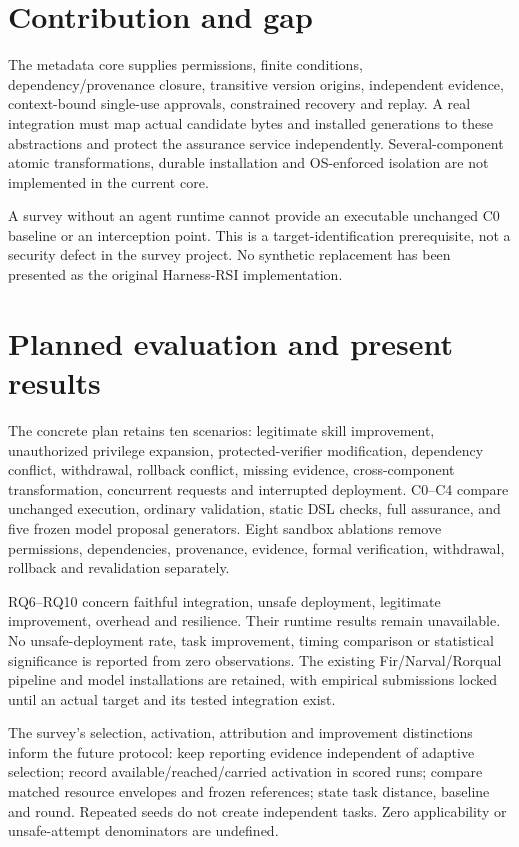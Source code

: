 \documentclass[11pt]{article}
\begin{document}
\section{Contribution and gap}
The metadata core supplies permissions, finite conditions, dependency/provenance closure, transitive version origins, independent evidence, context-bound single-use approvals, constrained recovery and replay. A real integration must map actual candidate bytes and installed generations to these abstractions and protect the assurance service independently. Several-component atomic transformations, durable installation and OS-enforced isolation are not implemented in the current core.

A survey without an agent runtime cannot provide an executable unchanged C0 baseline or an interception point. This is a target-identification prerequisite, not a security defect in the survey project. No synthetic replacement has been presented as the original Harness-RSI implementation.

\section{Planned evaluation and present results}
The concrete plan retains ten scenarios: legitimate skill improvement, unauthorized privilege expansion, protected-verifier modification, dependency conflict, withdrawal, rollback conflict, missing evidence, cross-component transformation, concurrent requests and interrupted deployment. C0--C4 compare unchanged execution, ordinary validation, static DSL checks, full assurance, and five frozen model proposal generators. Eight sandbox ablations remove permissions, dependencies, provenance, evidence, formal verification, withdrawal, rollback and revalidation separately.

RQ6--RQ10 concern faithful integration, unsafe deployment, legitimate improvement, overhead and resilience. Their runtime results remain unavailable. No unsafe-deployment rate, task improvement, timing comparison or statistical significance is reported from zero observations. The existing Fir/Narval/Rorqual pipeline and model installations are retained, with empirical submissions locked until an actual target and its tested integration exist.

The survey's selection, activation, attribution and improvement distinctions inform the future protocol: keep reporting evidence independent of adaptive selection; record available/reached/carried activation in scored runs; compare matched resource envelopes and frozen references; state task distance, baseline and round. Repeated seeds do not create independent tasks. Zero applicability or unsafe-attempt denominators are undefined.
\end{document}
